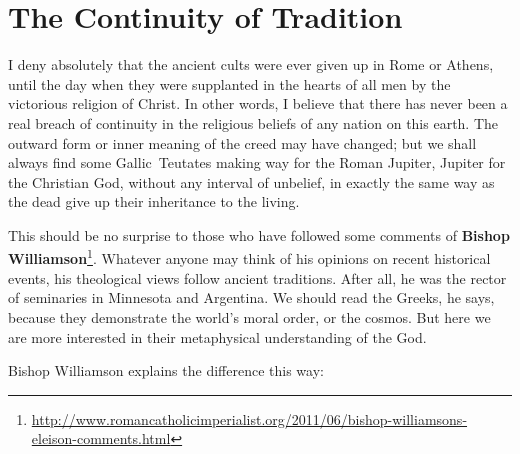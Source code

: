 \section{The Continuity of Tradition}

\begin{quotex}
I deny absolutely that the ancient cults were ever given up in Rome or Athens, until the day when they were supplanted in the hearts of all men by the victorious religion of Christ. In other words, I believe that there has never been a real breach of continuity in the religious beliefs of any nation on this earth. The outward form or inner meaning of the creed may have changed; but we shall always find some Gallic Teutates making way for the Roman Jupiter, Jupiter for the Christian God, without any interval of unbelief, in exactly the same way as the dead give up their inheritance to the living. 

\end{quotex}
This should be no surprise to those who have followed some comments of \textbf{Bishop Williamson}\footnote{\url{http://www.romancatholicimperialist.org/2011/06/bishop-williamsons-eleison-comments.html}}. Whatever anyone may think of his opinions on recent historical events, his theological views follow ancient traditions. After all, he was the rector of seminaries in Minnesota and Argentina. We should read the Greeks, he says, because they demonstrate the world's moral order, or the cosmos. But here we are more interested in their metaphysical understanding of the God.

Bishop Williamson explains the difference this way:


